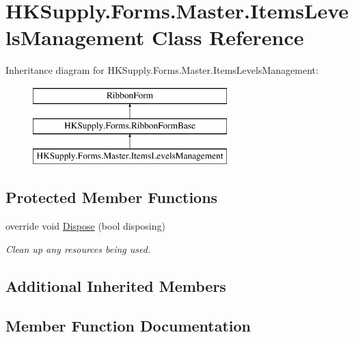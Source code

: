 \hypertarget{class_h_k_supply_1_1_forms_1_1_master_1_1_items_levels_management}{}\section{H\+K\+Supply.\+Forms.\+Master.\+Items\+Levels\+Management Class Reference}
\label{class_h_k_supply_1_1_forms_1_1_master_1_1_items_levels_management}
Inheritance diagram for H\+K\+Supply.\+Forms.\+Master.\+Items\+Levels\+Management\+:\begin{figure}[H]
\begin{center}
\leavevmode
\includegraphics[height=3.000000cm]{class_h_k_supply_1_1_forms_1_1_master_1_1_items_levels_management}
\end{center}
\end{figure}
\subsection*{Protected Member Functions}
\begin{DoxyCompactItemize}
\item 
override void \mbox{\hyperlink{class_h_k_supply_1_1_forms_1_1_master_1_1_items_levels_management_a942fc202cad65362e5bc54017702252c}{Dispose}} (bool disposing)
\begin{DoxyCompactList}\small\item\em Clean up any resources being used. \end{DoxyCompactList}\end{DoxyCompactItemize}
\subsection*{Additional Inherited Members}


\subsection{Member Function Documentation}
\mbox{\label{class_h_k_supply_1_1_forms_1_1_master_1_1_items_levels_management_a942fc202cad65362e5bc54017702252c}} 
